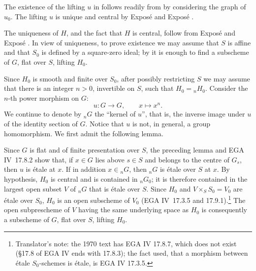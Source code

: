
The existence of the lifting \(u\) in  follows
readily from  by considering the graph of \(u_0\). The
lifting \(u\) is unique and central by Exposé  and Exposé .

The uniqueness of \(H\), and the fact that \(H\) is central, follow
from Exposé  and Exposé . In view of uniqueness, to
prove existence we may assume that \(S\) is affine and that \(S_0\) is
defined by a square-zero ideal; by  it is enough to find
a subscheme of \(G\), flat over \(S\), lifting \(H_0\).

Since \(H_0\) is smooth and finite over \(S_0\), after possibly
restricting \(S\) we may assume that there is an integer \(n>0\),
invertible on \(S\), such that \(H_0={}_nH_0\). Consider the \(n\)-th
power morphism on \(G\):
\[
  u:G\longrightarrow G,\qquad x\longmapsto x^n.
\]
We continue to denote by \({}_nG\) the ``kernel of \(u\)'', that is,
the inverse image under \(u\) of the identity section of \(G\).
Notice that \(u\) is not, in general, a group homomorphism. We first
admit the following lemma.


Since \(G\) is flat and of finite presentation over \(S\), the
preceding lemma and EGA IV~17.8.2 show that, if \(x\in G\) lies above
\(s\in S\) and belongs to the centre of \(G_s\), then \(u\) is étale
at \(x\). If in addition \(x\in {}_nG\), then \({}_nG\) is étale over
\(S\) at \(x\). By hypothesis, \(H_0\) is central and is contained in
\({}_nG_0\); it is therefore contained in the largest open subset
\(V\) of \({}_nG\) that is étale over \(S\). Since \(H_0\) and
\(V\times_S S_0=V_0\) are étale over \(S_0\), \(H_0\) is an open
subscheme of \(V_0\) (EGA IV~17.3.5 and 17.9.1).\footnote{Translator's
note: the 1970 text has EGA IV 17.8.7, which does not exist (\S17.8 of
EGA IV ends with 17.8.3); the fact used, that a morphism between étale
\(S_0\)-schemes is étale, is EGA IV 17.3.5.} The open subprescheme
of \(V\) having the same underlying space as \(H_0\) is consequently
a subscheme of \(G\), flat over \(S\), lifting \(H_0\).

